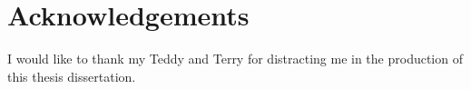 \chapter*{Acknowledgements}

I would like to thank my Teddy and Terry for distracting me in the production
of this thesis dissertation.